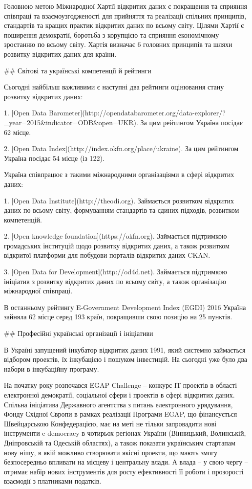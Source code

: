 Головною метою Міжнародної Хартії відкритих даних є покращення та сприяння співпраці та взаємоузгодженості для прийняття та реалізації спільних принципів, стандартів та кращих практик відкритих даних по всьому світу. Цілями Хартії є поширення демократії, боротьба з корупцією та сприяння економічному зростанню по всьому світу. Хартія визначає 6 головних принципів та шляхи розвитку відкритих даних для країни.

## Світові та українські компетенції й рейтинги

Сьогодні найбільш важливими є наступні два рейтинги оцінювання стану розвитку відкритих даних:

1. [Open Data Barometer](http://opendatabarometer.org/data-explorer/?_year=2015&indicator=ODB&open=UKR). За цим рейтингом Україна посідає 62 місце.

2. [Open Data Index](http://index.okfn.org/place/ukraine). За цим рейтингом Україна посідає 54 місце (із 122).

Україна співпрацює з такими міжнародними організаціями в сфері відкритих даних: 

1. [Open Data Institute](http://theodi.org). Займається розвитком відкритих даних по всьому світу, формуванням стандартів та єдиних підходів, розвитком компетенцій.

2. [Open knowledge foundation](https://okfn.org). Займається підтримкою громадських інституцій щодо розвитку відкритих даних, а також розвитком відкритої платформи для побудови порталів відкритих даних CKAN.

3. [Open Data for Development](http://od4d.net). Займається підтримкою ініціатив з розвитку відкритих даних по всьому світу, а також організацію міжнародної співпраці.

В останньому рейтингу E-Government Development Index (EGDI) 2016 Україна зайняла 62 місце серед 193 країн, покращивши свою позицію на 25 пунктів.

## Професійні українські організації і ініціативи

В Україні запущений інкубатор відкритих даних 1991, який системно займається відбором проектів, їх інкубацією і пошуком інвестицій. На сьогодні уже було два набори в інкубаційну програму. 

На початку року розпочався EGAP Challenge – конкурс ІТ проектів в області електронної демократії, соціальної сфери і проектів в сфері відкритих даних. Спільна ініціатива Державного агентства з питань електронного урядування, Фонду Східної Європи в рамках реалізації Програми EGAP, що фінансується Швейцарською Конфедерацією, має на меті не тільки запровадити нові інструменти e-democracy в чотирьох регіонах України (Вінницький, Волинській, Дніпровській та Одеській областях), а також показати українським стартапам нову нішу, в якій можливо створювати якісні проекти, що мають змогу безпосередньо впливати на місцеву і центральну влади. А влада – у свою чергу – отримає набір нових інструментів для росту ефективності її роботи і прозорості взаємодії з платниками податків.

